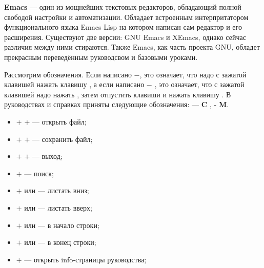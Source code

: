 \textbf{Emacs} --- один из мощнейших текстовых редакторов, обладающий полной свободой настройки и автоматизации. Обладает встроенным интерпритатором функционального языка Emacs Lisp на котором написан сам редактор и его расширения. Существуют две версии: GNU Emacs и XEmacs, однако сейчас различия между ними стираются. Также Emacs, как часть проекта GNU, обладет прекрасным переведённым руководсвом и базовыми уроками.

Рассмотрим обозначения. Если написано \Ctrl$-$, это означает, что надо с зажатой клавишей \Ctrl нажать клавишу , а если написано \Ctrl$-$ , это означает, что с зажатой клавишей \Ctrl надо нажать , затем отпустить клавиши и нажать клавишу . В руководствах и справках приняты следующие обозначения: \Ctrl --- \textbf{C} , \Alt - \textbf{M}.

\begin{itemize}
  \item \Ctrl$+$ \Ctrl$+$  --- открыть файл;
  \item \Ctrl$+$ \Ctrl$+$  --- сохранить файл;
  \item \Ctrl$+$ \Ctrl$+$  --- выход;
  \item \Ctrl$+$           --- поиск;
  \item \Ctrl$+$ или \PgDown  --- листать вниз;
  \item \Alt$+$  или \PgUp    --- листать вверх;
  \item \Ctrl$+$ или \Home  --- в начало строки;
  \item \Ctrl$+$ или \End   --- в конец строки;
  \item \Ctrl$+$   --- открыть info-страницы руководства;
\end{itemize}

